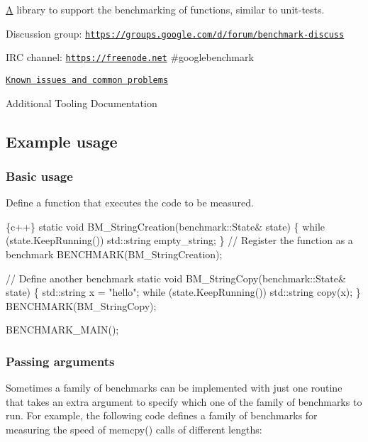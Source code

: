 \href{https://travis-ci.org/google/benchmark}{\tt } \href{https://ci.appveyor.com/project/google/benchmark/branch/master}{\tt } \href{https://coveralls.io/r/google/benchmark}{\tt }

\mbox{\hyperlink{struct_a}{A}} library to support the benchmarking of functions, similar to unit-\/tests.

Discussion group\+: \href{https://groups.google.com/d/forum/benchmark-discuss}{\tt https\+://groups.\+google.\+com/d/forum/benchmark-\/discuss}

I\+RC channel\+: \href{https://freenode.net}{\tt https\+://freenode.\+net} \#googlebenchmark

\href{#known-issues}{\tt Known issues and common problems}

Additional Tooling Documentation

\subsection*{Example usage}

\subsubsection*{Basic usage}

Define a function that executes the code to be measured.


\begin{DoxyCode}
\{c++\}
static void BM\_StringCreation(benchmark::State& state) \{
  while (state.KeepRunning())
    std::string empty\_string;
\}
// Register the function as a benchmark
BENCHMARK(BM\_StringCreation);

// Define another benchmark
static void BM\_StringCopy(benchmark::State& state) \{
  std::string x = "hello";
  while (state.KeepRunning())
    std::string copy(x);
\}
BENCHMARK(BM\_StringCopy);

BENCHMARK\_MAIN();
\end{DoxyCode}


\subsubsection*{Passing arguments}

Sometimes a family of benchmarks can be implemented with just one routine that takes an extra argument to specify which one of the family of benchmarks to run. For example, the following code defines a family of benchmarks for measuring the speed of {\ttfamily memcpy()} calls of different lengths\+:


